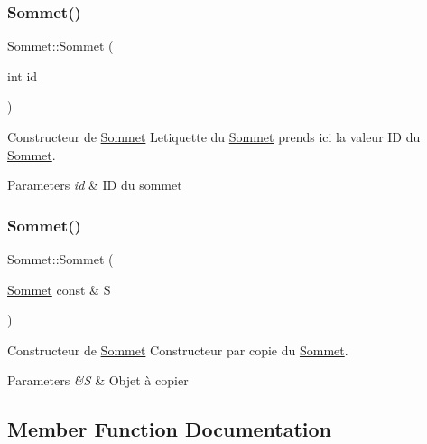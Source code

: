 \subsubsection{\texorpdfstring{Sommet()}{Sommet()}\hspace{0.1cm}{\footnotesize\ttfamily [4/5]}}
{\footnotesize\ttfamily Sommet\+::\+Sommet (\begin{DoxyParamCaption}\item[{int}]{id }\end{DoxyParamCaption})}



Constructeur de \hyperlink{classSommet}{Sommet} L\textquotesingle{}etiquette du \hyperlink{classSommet}{Sommet} prends ici la valeur ID du \hyperlink{classSommet}{Sommet}. 


\begin{DoxyParams}{Parameters}
{\em id} & ID du sommet \\
\hline
\end{DoxyParams}
\mbox{\label{classSommet_ad8ff076abfbec4d8ab07ff3f665ad426}} 
\subsubsection{\texorpdfstring{Sommet()}{Sommet()}\hspace{0.1cm}{\footnotesize\ttfamily [5/5]}}
{\footnotesize\ttfamily Sommet\+::\+Sommet (\begin{DoxyParamCaption}\item[{\hyperlink{classSommet}{Sommet} const \&}]{S }\end{DoxyParamCaption})}



Constructeur de \hyperlink{classSommet}{Sommet} Constructeur par copie du \hyperlink{classSommet}{Sommet}. 


\begin{DoxyParams}{Parameters}
{\em \&S} & Objet \`{a} copier \\
\hline
\end{DoxyParams}


\subsection{Member Function Documentation}
\mbox{\label{classSommet_a4b0f2f9224353b18ae95033431b3be35}} 
